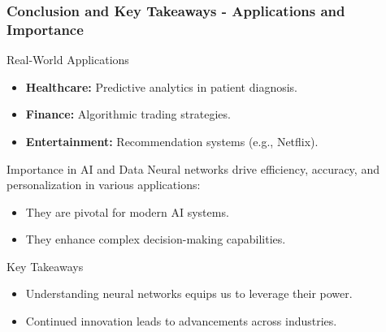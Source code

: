 \documentclass[aspectratio=169]{beamer}
\begin{document}
\begin{frame}[fragile]
    \frametitle{Conclusion and Key Takeaways - Applications and Importance}
    \begin{block}{Real-World Applications}
        \begin{itemize}
            \item \textbf{Healthcare:} Predictive analytics in patient diagnosis.
            \item \textbf{Finance:} Algorithmic trading strategies.
            \item \textbf{Entertainment:} Recommendation systems (e.g., Netflix).
        \end{itemize}
    \end{block}

    \begin{block}{Importance in AI and Data}
        Neural networks drive efficiency, accuracy, and personalization in various applications:
        \begin{itemize}
            \item They are pivotal for modern AI systems.
            \item They enhance complex decision-making capabilities.
        \end{itemize}
    \end{block}

    \begin{block}{Key Takeaways}
        \begin{itemize}
            \item Understanding neural networks equips us to leverage their power.
            \item Continued innovation leads to advancements across industries.
        \end{itemize}
    \end{block}
\end{frame}
\end{document}
